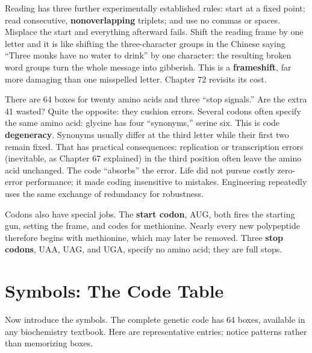Reading has three further experimentally established rules: start at a fixed point; read consecutive, \textbf{nonoverlapping} triplets; and use no commas or spaces. Misplace the start and everything afterward fails. Shift the reading frame by one letter and it is like shifting the three-character groups in the Chinese saying ``Three monks have no water to drink'' by one character: the resulting broken word groups turn the whole message into gibberish. This is a \textbf{frameshift}, far more damaging than one misspelled letter. Chapter 72 revisits its cost.

\begin{qiaoliang}
There are 64 boxes for twenty amino acids and three ``stop signals.'' Are the extra 41 wasted? Quite the opposite: they cushion errors. Several codons often specify the same amino acid: glycine has four ``synonyms,'' serine six. This is code \textbf{degeneracy}. Synonyms usually differ at the third letter while their first two remain fixed. That has practical consequences: replication or transcription errors (inevitable, as Chapter 67 explained) in the third position often leave the amino acid unchanged. The code ``absorbs'' the error. Life did not pursue costly zero-error performance; it made coding insensitive to mistakes. Engineering repeatedly uses the same exchange of redundancy for robustness.
\end{qiaoliang}

Codons also have special jobs. The \textbf{start codon}, AUG, both fires the starting gun, setting the frame, and codes for methionine. Nearly every new polypeptide therefore begins with methionine, which may later be removed. Three \textbf{stop codons}, UAA, UAG, and UGA, specify no amino acid; they are full stops.

\section{Symbols: The Code Table}

Now introduce the symbols. The complete genetic code has 64 boxes, available in any biochemistry textbook. Here are representative entries; notice patterns rather than memorizing boxes.

